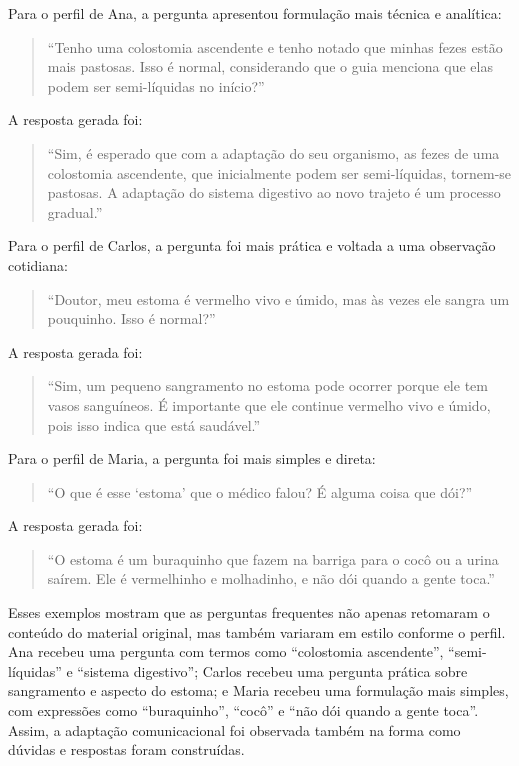 Para o perfil de Ana, a pergunta apresentou formulação mais técnica e analítica:

\begin{quote}
``Tenho uma colostomia ascendente e tenho notado que minhas fezes estão mais pastosas. Isso é normal, considerando que o guia menciona que elas podem ser semi-líquidas no início?''
\end{quote}

A resposta gerada foi:

\begin{quote}
``Sim, é esperado que com a adaptação do seu organismo, as fezes de uma colostomia ascendente, que inicialmente podem ser semi-líquidas, tornem-se pastosas. A adaptação do sistema digestivo ao novo trajeto é um processo gradual.''
\end{quote}

Para o perfil de Carlos, a pergunta foi mais prática e voltada a uma observação cotidiana:

\begin{quote}
``Doutor, meu estoma é vermelho vivo e úmido, mas às vezes ele sangra um pouquinho. Isso é normal?''
\end{quote}

A resposta gerada foi:

\begin{quote}
``Sim, um pequeno sangramento no estoma pode ocorrer porque ele tem vasos sanguíneos. É importante que ele continue vermelho vivo e úmido, pois isso indica que está saudável.''
\end{quote}

Para o perfil de Maria, a pergunta foi mais simples e direta:

\begin{quote}
``O que é esse `estoma' que o médico falou? É alguma coisa que dói?''
\end{quote}

A resposta gerada foi:

\begin{quote}
``O estoma é um buraquinho que fazem na barriga para o cocô ou a urina saírem. Ele é vermelhinho e molhadinho, e não dói quando a gente toca.''
\end{quote}

Esses exemplos mostram que as perguntas frequentes não apenas retomaram o conteúdo do material original, mas também variaram em estilo conforme o perfil. Ana recebeu uma pergunta com termos como ``colostomia ascendente'', ``semi-líquidas'' e ``sistema digestivo''; Carlos recebeu uma pergunta prática sobre sangramento e aspecto do estoma; e Maria recebeu uma formulação mais simples, com expressões como ``buraquinho'', ``cocô'' e ``não dói quando a gente toca''. Assim, a adaptação comunicacional foi observada também na forma como dúvidas e respostas foram construídas.

